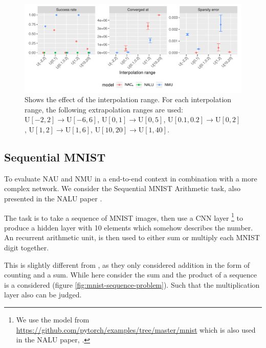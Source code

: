 \begin{figure}[ht]
\centering
\includegraphics[width=\linewidth]{results/simple_function_static_range.pdf}
\caption{Shows the effect of the interpolation range. For each interpolation range, the following extrapolation ranges are used: ${\mathrm{U}[-2,2] \rightarrow \mathrm{U}[-6,6]}$, ${\mathrm{U}[0,1] \rightarrow \mathrm{U}[0,5]}$, ${\mathrm{U}[0.1,0.2] \rightarrow \mathrm{U}[0,2]}$, ${\mathrm{U}[1,2] \rightarrow \mathrm{U}[1,6]}$, ${\mathrm{U}[10, 20] \rightarrow \mathrm{U}[1, 40]}$.}
\label{fig:simple-fnction-static-range}
\end{figure}

\subsection{Sequential MNIST}

To evaluate NAU and NMU in a end-to-end context in combination with a more complex network. We consider the Sequential MNIST Arithmetic task, also presented in the NALU paper \cite{trask-nalu}.

The task is to take a sequence of MNIST images, then use a CNN layer \footnote{We use the model from \url{https://github.com/pytorch/examples/tree/master/mnist} which is also used in the NALU paper, \cite{trask-nalu}.} to produce a hidden layer with 10 elements which somehow describes the number. An recurrent arithmetic unit, is then used to either sum or multiply each MNIST digit together.

This is slightly different from \cite{trask-nalu}, as they only considered addition in the form of counting and a sum. While here consider the sum and the product of a sequence is a considered (figure \ref{fig:mnist-sequence-problem}). Such that the multiplication layer also can be judged.

